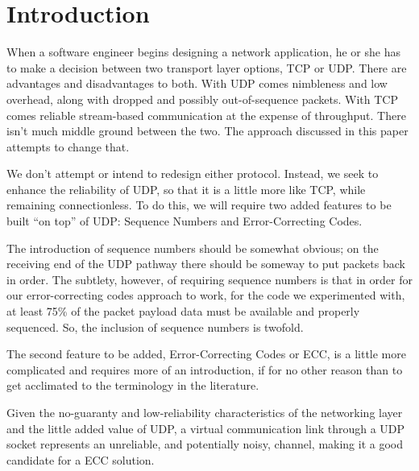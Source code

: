 \documentclass[conference]{IEEEtran}
\theoremstyle{definition}
\begin{document}
%
\IEEEpeerreviewmaketitle



\section{Introduction}
When a software engineer begins designing a
network application, he or she has to make a decision between
two transport layer options, TCP or UDP.  There are advantages
and disadvantages to both.  With UDP comes nimbleness and low
overhead, along with dropped and possibly out-of-sequence 
packets.  With TCP comes reliable stream-based communication
at the expense of throughput.  There isn't much middle ground
between the two.  The approach discussed in this paper attempts
to change that.

We don't attempt or intend to redesign either protocol.  Instead,
we seek to enhance the reliability of UDP, so that it is a little
more like TCP, while remaining connectionless.  To do this, we
will require two added features to be built ``on top'' of UDP:
Sequence Numbers and Error-Correcting Codes.

The introduction of sequence numbers should be somewhat obvious;
on the receiving end of the UDP pathway there should be someway
to put packets back in order.  The subtlety, however, of requiring
sequence numbers is that in order for our error-correcting codes
approach to work, for the code we experimented with, at least 75\%
of the packet payload data must be available and properly
sequenced.  So, the inclusion of sequence numbers is twofold.

The second feature to be added, Error-Correcting Codes or ECC, is a
little more complicated and requires more of an introduction,
if for no other reason than to get acclimated to the terminology
in the literature.

Given the no-guaranty and low-reliability characteristics of
the networking layer and the little added value of UDP,
a virtual communication link through a UDP socket represents
an unreliable, and potentially noisy, channel, making it
a good candidate for a ECC solution.
\end{document}
